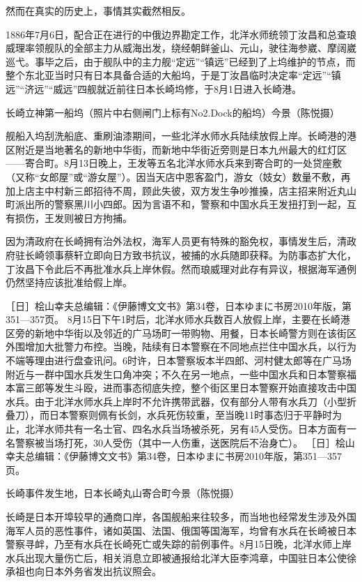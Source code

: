 \documentclass[12pt,UTF8]{ctexbook}
\begin{document}
然而在真实的历史上，事情其实截然相反。

1886年7月6日，配合正在进行的中俄边界勘定工作，北洋水师统领丁汝昌和总查琅威理率领舰队的全部主力从威海出发，绕经朝鲜釜山、元山，驶往海参崴、摩阔崴巡弋。事毕之后，由于舰队中的主力舰“定远”“镇远”已经到了上坞维护的节点，而整个东北亚当时只有日本具备合适的大船坞，于是丁汝昌临时决定率“定远”“镇远”“济远”“威远”四舰就近前往日本长崎坞修，于8月1日进入长崎港。


长崎立神第一船坞（照片中右侧闸门上标有No2.Dock的船坞）今景（陈悦摄）

舰船入坞刮洗船底、重刷油漆期间，一些北洋水师水兵陆续放假上岸。长崎港的港区附近是当地著名的新地中华街，而新地中华街近旁则是日本九州最大的红灯区——寄合町。8月13日晚上，王发等五名北洋水师水兵来到寄合町的一处贷座敷（又称“女郎屋”或“游女屋”）。因当天店中恩客盈门，游女（妓女）数量不敷，再加上店主中村新三郎招待不周，顾此失彼，双方发生争吵推搡，店主招来附近丸山町派出所的警察黑川小四郎。因为言语不和，警察和中国水兵王发扭打到一起，互有损伤，王发则被日方拘捕。

因为清政府在长崎拥有治外法权，海军人员更有特殊的豁免权，事情发生后，清政府驻长崎领事蔡轩立即向日方致书抗议，被捕的水兵随即获释。为防事态扩大化，丁汝昌下令此后不再批准水兵上岸休假。然而琅威理对此存有异议，根据海军通例仍然坚持应该批准给假上岸。

［日］桧山幸夫总编辑：《伊藤博文文书》第34卷，日本ゆまに书房2010年版，第351—357页。
8月15日下午1时后，北洋水师水兵数百人放假上岸，主要在长崎港区旁的新地中华街以及邻近的广马场町一带购物、用餐，日本长崎警方则在该街区外围增加大批警力布控。当晚，陆续有日本警察在不同地点拦住中国水兵，以行为不端等理由进行盘查讯问。6时许，日本警察坂本半四郎、河村健太郎等在广马场附近与一群中国水兵发生口角冲突；不久在另一地点，一些中国水兵和日本警察福本富三郎等发生斗殴，进而事态彻底失控，整个街区里日本警察开始直接攻击中国水兵。由于北洋水师水兵上岸时不允许携带武器，仅有部分人带有水兵刀（小型折叠刀），而日本警察则佩有长剑，水兵死伤较重，至当晚11时事态归于平静时为止，北洋水师共有一名士官、四名水兵当场被杀死，另有45人受伤。日本方面有一名警察被当场打死，30人受伤（其中一人伤重，送医院后不治身亡）。 ［日］桧山幸夫总编辑：《伊藤博文文书》第34卷，日本ゆまに书房2010年版，第351—357页。


长崎事件发生地，日本长崎丸山寄合町今景（陈悦摄）

长崎是日本开埠较早的通商口岸，各国舰船来往较多，而当地也经常发生涉及外国海军人员的恶性事件，诸如英国、法国、俄国等国海军，均曾有水兵在长崎被日本警察寻衅，乃至有水兵在长崎死亡或失踪的前例事件。8月15日晚，北洋水师上岸水兵出现大量伤亡后，相关消息立即被通报给北洋大臣李鸿章，中国驻日本公使徐承祖也向日本外务省发出抗议照会。
\end{document}
